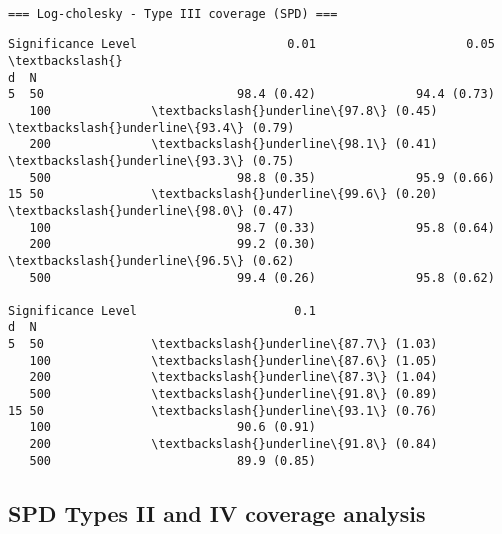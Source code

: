 \documentclass[11pt]{article}
\begin{document}
    
    \begin{Verbatim}[commandchars=\\\{\}]

=== Log-cholesky - Type III coverage (SPD) ===
    \end{Verbatim}

    
    \begin{Verbatim}[commandchars=\\\{\}]
Significance Level                     0.01                     0.05  \textbackslash{}
d  N                                                                   
5  50                           98.4 (0.42)              94.4 (0.73)   
   100              \textbackslash{}underline\{97.8\} (0.45)  \textbackslash{}underline\{93.4\} (0.79)   
   200              \textbackslash{}underline\{98.1\} (0.41)  \textbackslash{}underline\{93.3\} (0.75)   
   500                          98.8 (0.35)              95.9 (0.66)   
15 50               \textbackslash{}underline\{99.6\} (0.20)  \textbackslash{}underline\{98.0\} (0.47)   
   100                          98.7 (0.33)              95.8 (0.64)   
   200                          99.2 (0.30)  \textbackslash{}underline\{96.5\} (0.62)   
   500                          99.4 (0.26)              95.8 (0.62)   

Significance Level                      0.1  
d  N                                         
5  50               \textbackslash{}underline\{87.7\} (1.03)  
   100              \textbackslash{}underline\{87.6\} (1.05)  
   200              \textbackslash{}underline\{87.3\} (1.04)  
   500              \textbackslash{}underline\{91.8\} (0.89)  
15 50               \textbackslash{}underline\{93.1\} (0.76)  
   100                          90.6 (0.91)  
   200              \textbackslash{}underline\{91.8\} (0.84)  
   500                          89.9 (0.85)  
    \end{Verbatim}

    
    \subsection{SPD Types II and IV coverage
analysis}\label{spd-types-ii-and-iv-coverage-analysis}
\end{document}
